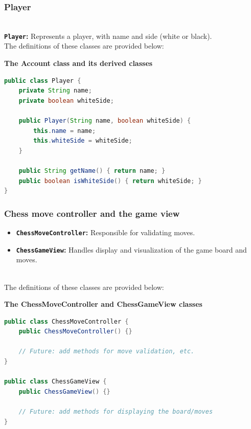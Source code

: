 \subsubsection{Player}\label{89rX_hNCdqtSKCXBYda8T}
\\
\textbf{\texttt{Player}:} Represents a player, with name and side (white or black).
\\
The definitions of these classes are provided below:

\textbf{The Account class and its derived classes}

\begin{lstlisting}[language=Java]
public class Player {
    private String name;
    private boolean whiteSide;

    public Player(String name, boolean whiteSide) {
        this.name = name;
        this.whiteSide = whiteSide;
    }

    public String getName() { return name; }
    public boolean isWhiteSide() { return whiteSide; }
}
\end{lstlisting}

\subsubsection{Chess move controller and the game view}\label{oSpv565bGtSL7OCoKOOyo}

\begin{itemize}
\item
\protect{}\label{904e65pdDtuWIgkUpHMMg}
\textbf{\texttt{ChessMoveController}:} Responsible for validating moves.
\item
\protect{}\label{lMcZFcsLgblDEQ3hXxiGw}
\textbf{\texttt{ChessGameView}:} Handles display and visualization of the game board and moves.
\end{itemize}
\\
The definitions of these classes are provided below:

\textbf{The ChessMoveController and ChessGameView classes}

\begin{lstlisting}[language=Java]
public class ChessMoveController {
    public ChessMoveController() {}

    // Future: add methods for move validation, etc.
}

public class ChessGameView {
    public ChessGameView() {}

    // Future: add methods for displaying the board/moves
}
\end{lstlisting}

